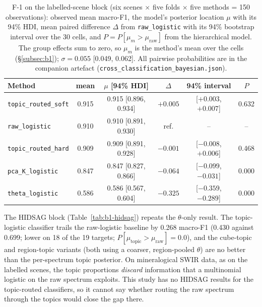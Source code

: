 \documentclass[journal,a4paper,10pt]{IEEEtran}
\begin{document}
\begin{table}[t]
\caption{F-1 on the labelled-scene block (six scenes $\times$ five
folds $\times$ five methods = 150 observations): observed mean
macro-F1, the model's posterior location $\mu$ with its 94\% HDI, mean
paired difference $\Delta$ from \texttt{raw\_logistic} with its 94\%
bootstrap interval over the 30 cells, and
$P = P[\mu_m > \mu_{\text{raw}}]$ from the hierarchical model. The group
effects sum to zero, so $\mu_m$ is the method's mean over the cells
(\S\ref{subsec:b1}); $\sigma = 0.055$ [0.049, 0.062]. All pairwise
probabilities are in the companion artefact
(\texttt{cross\_classification\_bayesian.json}).}
\label{tab:b1-labelled}
\centering
\scriptsize
\setlength{\tabcolsep}{3pt}
\begin{tabular}{@{}lccccc@{}}
\toprule
Method & mean & $\mu$ [94\% HDI] & $\Delta$ & 94\% interval & $P$ \\
\midrule
\texttt{topic\_routed\_soft}  & 0.915 & 0.915 [0.896, 0.934] & $+0.005$ & [$+0.003$, $+0.007$] & 0.632 \\
\texttt{raw\_logistic}        & 0.910 & 0.910 [0.891, 0.930] & ref.     & --                   & --    \\
\texttt{topic\_routed\_hard}  & 0.909 & 0.909 [0.891, 0.928] & $-0.001$ & [$-0.008$, $+0.006$] & 0.468 \\
\texttt{pca\_K\_logistic}     & 0.847 & 0.847 [0.827, 0.866] & $-0.064$ & [$-0.099$, $-0.031$] & 0.000 \\
\texttt{theta\_logistic}      & 0.586 & 0.586 [0.567, 0.604] & $-0.325$ & [$-0.359$, $-0.289$] & 0.000 \\
\bottomrule
\end{tabular}
\end{table}

The HIDSAG block (Table~\ref{tab:b1-hidsag}) repeats the $\theta$-only
result. The topic-logistic classifier trails the raw-logistic baseline
by 0.268 macro-F1 (0.430 against 0.699; lower on 18 of the 19 targets;
$P[\mu_{\text{topic}} > \mu_{\text{raw}}] = 0.0$), and the cube-topic
and region-topic variants (both using a coarser, region-pooled
$\theta$) are no better than the per-spectrum topic posterior. On
mineralogical SWIR data, as on the labelled scenes, the topic
proportions \emph{discard} information that a multinomial logistic on
the raw spectrum exploits. This study has no HIDSAG results for the
topic-routed classifiers, so it cannot say whether routing the raw
spectrum through the topics would close the gap there.
\end{document}
